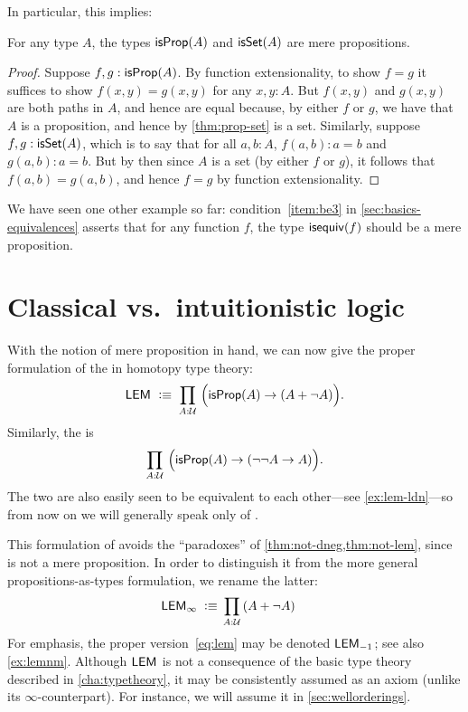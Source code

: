 In particular, this implies:

\begin{lem}\label{thm:isprop-isprop}\label{thm:isprop-isset}
  For any type $A$, the types $\mathsf{isProp}(A)$ and $\mathsf{isSet}(A)$ are mere propositions.
\end{lem}
\begin{proof}
  Suppose $f,g:\mathsf{isProp}(A)$.  By function extensionality, to show $f=g$ it
  suffices to show $f(x,y)=g(x,y)$ for any $x,y:A$.  But $f(x,y)$ and $g(x,y)$
  are both paths in $A$, and hence are equal because, by either $f$ or $g$, we
  have that $A$ is a proposition, and hence by \autoref{thm:prop-set} is a
  set.  Similarly, suppose $f,g:\mathsf{isSet}(A)$, which is to say that for all
  $a,b:A$, $f(a,b):a=b$ and $g(a,b):a=b$.  But by then since $A$ is a set (by
  either $f$ or $g$), it follows that $f(a,b)=g(a,b)$, and hence $f=g$ by
  function extensionality.
\end{proof}

We have seen one other example so far: condition~\ref{item:be3} in \autoref{sec:basics-equivalences} asserts that for any function $f$, the type $\mathsf{isequiv} (f)$ should be a mere proposition.


\section{Classical vs.\ intuitionistic logic}
\label{sec:intuitionism}

With the notion of mere proposition in hand, we can now give the proper formulation of the  in homotopy type theory:
\begin{equation}
  \label{eq:lem}
  \LEM{}\;\defeq\;
  \prd{A:\UU} \Big(\isprop(A) \to (A + \neg A)\Big).
\end{equation}
Similarly, the  is
\begin{equation}
  \label{eq:ldn}
  \prd{A:\UU} \Big(\isprop(A) \to (\neg\neg A \to A)\Big).
\end{equation}
The two are also easily seen to be equivalent to each other---see \autoref{ex:lem-ldn}---so from now on we will generally speak only of \LEM{}.

This formulation of \LEM{} avoids the ``paradoxes'' of \autoref{thm:not-dneg,thm:not-lem}, since \bool is not a mere proposition.
In order to distinguish it from the more general propositions-as-types formulation, we rename the latter:
\begin{align*}
  \LEM\infty\;\defeq\;&
  \prd{A:\UU} (A + \neg A)
\end{align*}
For emphasis, the proper version~\eqref{eq:lem}
may be denoted $\mathsf{LEM}_{-1}$;
see also \autoref{ex:lemnm}.
Although $\mathsf{LEM}_{}$
is not a consequence of the basic type theory described in \autoref{cha:typetheory}, it may be consistently assumed as an axiom (unlike its $\infty$-counterpart).
For instance, we will assume it in \autoref{sec:wellorderings}.

